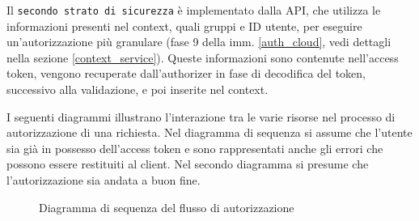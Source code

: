 Il \texttt{secondo strato di sicurezza} è implementato dalla API, che utilizza le informazioni presenti nel context, quali gruppi e ID utente, per eseguire un'autorizzazione più granulare (fase 9 della imm. \ref{auth_cloud}, vedi dettagli nella sezione \ref{context_service}).
Queste informazioni sono contenute nell'access token, vengono recuperate dall'authorizer in fase di decodifica del token, successivo alla validazione, e poi inserite nel context.

\vspace{0,3cm}

I seguenti diagrammi illustrano l'interazione tra le varie risorse nel processo di autorizzazione di una richiesta. Nel diagramma di sequenza si assume che l'utente sia già in possesso dell'access token e sono rappresentati anche gli errori che possono essere restituiti al client. Nel secondo diagramma si presume che l'autorizzazione sia andata a buon fine.


\begin{figure}[ht]
    \centering
    \caption{Diagramma di sequenza del flusso di autorizzazione}
    \label{auth_sequence}
\end{figure}

